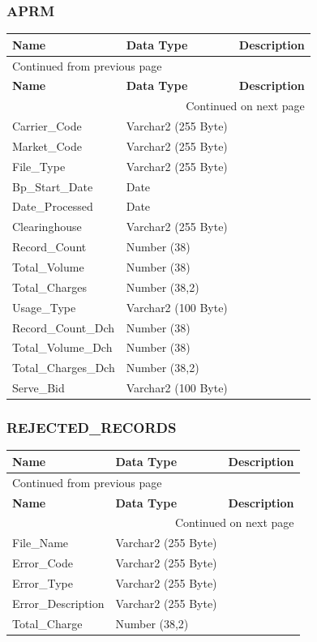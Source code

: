 \documentclass[12pt,twoside]{article}
\begin{document}
\normalsize
\subsubsection{APRM}
\label{sec:orgheadline159}
\footnotesize
\begin{longtable}{l|l|l}
\hline
\textbf{Name} & \textbf{Data Type} & \textbf{Description}\\
\hline
\endfirsthead
\multicolumn{3}{l}{Continued from previous page} \\
\hline

\textbf{Name} & \textbf{Data Type} & \textbf{Description} \\

\hline
\endhead
\hline\multicolumn{3}{r}{Continued on next page} \\
\endfoot
\endlastfoot
\hline
Carrier\_Code & Varchar2 (255 Byte) & \\
Market\_Code & Varchar2 (255 Byte) & \\
File\_Type & Varchar2 (255 Byte) & \\
Bp\_Start\_Date & Date & \\
Date\_Processed & Date & \\
Clearinghouse & Varchar2 (255 Byte) & \\
Record\_Count & Number (38) & \\
Total\_Volume & Number (38) & \\
Total\_Charges & Number (38,2) & \\
Usage\_Type & Varchar2 (100 Byte) & \\
Record\_Count\_Dch & Number (38) & \\
Total\_Volume\_Dch & Number (38) & \\
Total\_Charges\_Dch & Number (38,2) & \\
Serve\_Bid & Varchar2 (100 Byte) & \\
\hline
\end{longtable}
\normalsize
\subsubsection{REJECTED\_RECORDS}
\label{sec:orgheadline160}
\footnotesize
\begin{longtable}{l|l|l}
\hline
\textbf{Name} & \textbf{Data Type} & \textbf{Description}\\
\hline
\endfirsthead
\multicolumn{3}{l}{Continued from previous page} \\
\hline

\textbf{Name} & \textbf{Data Type} & \textbf{Description} \\

\hline
\endhead
\hline\multicolumn{3}{r}{Continued on next page} \\
\endfoot
\endlastfoot
\hline
File\_Name & Varchar2 (255 Byte) & \\
Error\_Code & Varchar2 (255 Byte) & \\
Error\_Type & Varchar2 (255 Byte) & \\
Error\_Description & Varchar2 (255 Byte) & \\
Total\_Charge & Number (38,2) & \\
\hline
\end{longtable}
\normalsize
\newpage
\end{document}
